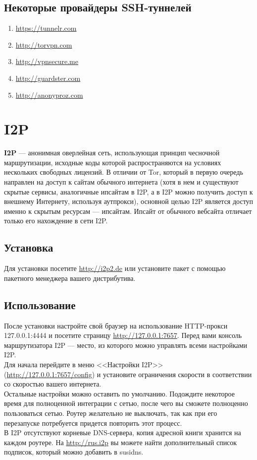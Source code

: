 \subsection{Некоторые провайдеры SSH-туннелей}
\begin{enumerate}
\item \url{https://tunnelr.com}
\item \url{http://torvpn.com}
\item \url{http://vpnsecure.me}
\item \url{http://guardster.com}
\item \url{http://anonyproz.com}
\end{enumerate}
\section{I2P}
\textbf{I2P} --- анонимная оверлейная сеть, использующая принцип чесночной маршрутизации, исходные коды которой распространяются на условиях нескольких свободных лицензий. В отличии от Tor, который в первую очередь направлен на доступ к сайтам обычного интернета (хотя в нем и существуют скрытые сервисы, аналогичные ипсайтам в I2P, а в I2P можно получить доступ к внешнему Интернету, используя аутпрокси), основной целью I2P является доступ именно к скрытым ресурсам --- ипсайтам. Ипсайт от обычного вебсайта отличает только его нахождение в сети I2P.
\subsection{Установка}
Для установки посетите \url{http://i2p2.de} или установите пакет с помощью пакетного менеджера вашего дистрибутива.
\subsection{Использование}
После установки настройте свой браузер на использование HTTP-прокси 127.0.0.1:4444 и посетите страницу \url{http://127.0.0.1:7657}. Перед вами консоль маршрутизатора I2P --- место, из которого можно управлять всеми настройками I2P.\\
Для начала перейдите в меню <<Настройки I2P>> (\url{http://127.0.0.1:7657/config}) и установите ограничения скорости в соответствии со скоростью вашего интернета.\\
Остальные настройки можно оставить по умолчанию. Подождите некоторое время для полноценной интеграции с сетью, после чего вы сможете полноценно пользоваться сетью. Роутер желательно не выключать, так как при его перезапуске потребуется придется повторить этот процесс.\\
В I2P отсутствуют корневые DNS-сервера, копия адресной книги хранится на каждом роутере. На \url{http://rus.i2p} вы можете найти дополнительный список подписок, который можно добавить в susidns.
